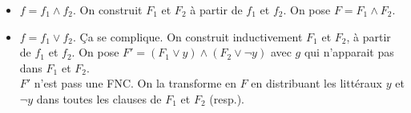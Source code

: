 \begin{demonstration}
\begin{enumeratebf}
\begin{itemize}
        \begin{itemize}
            \item $f = f_1 \wedge f_2$. On construit $F_1$ et $F_2$ à partir de $f_1$ et $f_2$. On pose $F = F_1 \wedge F_2$.
            \item $f = f_1 \vee f_2$. Ça se complique. On construit inductivement $F_1$ et $F_2$, à partir de $f_1$ et $f_2$. On pose $F' = (F_1 \vee y) \wedge (F_2 \vee \lnot y)$ avec $g$ qui n'apparait pas dans $F_1$ et $F_2$.\\
            $F'$ n'est pass une FNC. On la transforme en $F$ en distribuant les littéraux $y$ et $\lnot y$ dans toutes les clauses de $F_1$ et $F_2$ (resp.).
        \end{itemize}
    \end{itemize}
    \end{enumeratebf}
\end{demonstration}

